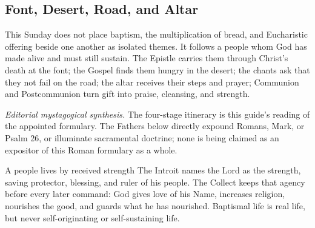 \begin{deepstudy}

\section*{Font, Desert, Road, and Altar}

This Sunday does not place baptism, the multiplication of bread, and Eucharistic offering beside one another as isolated themes. It follows a people whom God has made alive and must still sustain. The Epistle carries them through Christ's death at the font; the Gospel finds them hungry in the desert; the chants ask that they not fail on the road; the altar receives their steps and prayer; Communion and Postcommunion turn gift into praise, cleansing, and strength.

\begin{center}
\end{center}

\noindent\emph{Editorial mystagogical synthesis.} The four-stage itinerary is this guide's reading of the appointed formulary. The Fathers below directly expound Romans, Mark, or Psalm 26, or illuminate sacramental doctrine; none is being claimed as an expositor of this Roman formulary as a whole.

\begin{massbox}{A people lives by received strength}
The Introit names the Lord as the strength, saving protector, blessing, and ruler of his people. The Collect keeps that agency before every later command: God gives love of his Name, increases religion, nourishes the good, and guards what he has nourished. Baptismal life is real life, but never self-originating or self-sustaining life.
\end{massbox}


\end{deepstudy}
